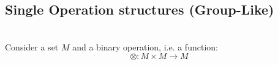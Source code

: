 \documentclass[a4paper,12pt]{scrartcl}    %
\newcommand{\OpA}{\otimes}
\begin{document}


\begin{landscape}


    \thispagestyle{empty}
    \noindent

	\begin{minipage}[t][]{0.30 \linewidth}
	    \section*{Single Operation structures (Group-Like)}
	    \mbox{}\\
		Consider a set $M$ and a binary operation, i.e. a function:
		\begin{displaymath}
			\OpA : M \times M \rightarrow M
		\end{displaymath}
		

\end{minipage}
\end{landscape}
\end{document}
